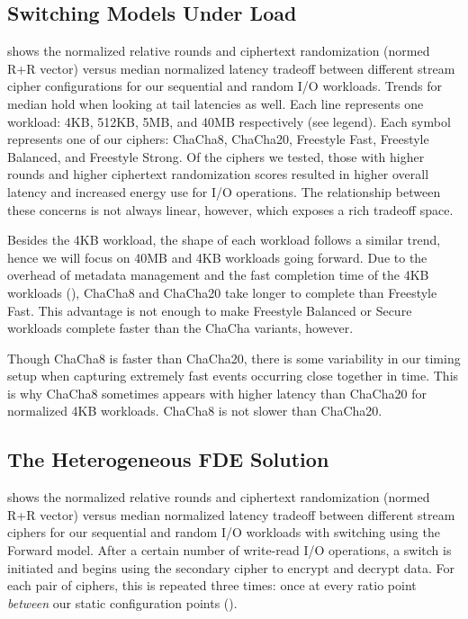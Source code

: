 \subsection{Switching Models Under Load}\label{subsec:eval-baseline}



 shows the normalized relative rounds and ciphertext
randomization (normed R+R vector) versus median normalized latency tradeoff
between different stream cipher configurations for our sequential and random I/O
workloads. Trends for median hold when looking at tail latencies as well. Each
line represents one workload: 4KB, 512KB, 5MB, and 40MB respectively (see
legend). Each symbol represents one of our ciphers: ChaCha8, ChaCha20, Freestyle
Fast, Freestyle Balanced, and Freestyle Strong. Of the ciphers we tested, those
with higher rounds and higher ciphertext randomization scores resulted in higher
overall latency and increased energy use for I/O operations. The relationship
between these concerns is not always linear, however, which exposes a rich
tradeoff space.

Besides the 4KB workload, the shape of each workload follows a similar trend,
hence we will focus on 40MB and 4KB workloads going forward. Due to the overhead
of metadata management and the fast completion time of the 4KB workloads
(), ChaCha8 and ChaCha20 take
longer to complete than Freestyle Fast. This advantage is not enough to make
Freestyle Balanced or Secure workloads complete faster than the ChaCha variants,
however.

Though ChaCha8 is faster than ChaCha20, there is some variability in our timing
setup when capturing extremely fast events occurring close together in time.
This is why ChaCha8 sometimes appears with higher latency than ChaCha20 for
normalized 4KB workloads. ChaCha8 is not slower than ChaCha20.


\subsection{The Heterogeneous FDE Solution}\label{subsec:eval-dynamic}



 shows the normalized relative rounds and ciphertext
randomization (normed R+R vector) versus median normalized latency tradeoff
between different stream ciphers for our sequential and random I/O workloads
with switching using the Forward model. After a certain number of write-read I/O
operations, a switch is initiated and \sys begins using the secondary cipher to
encrypt and decrypt data. For each pair of ciphers, this is repeated three
times: once at every ratio point {\em between} our static configuration points
().

